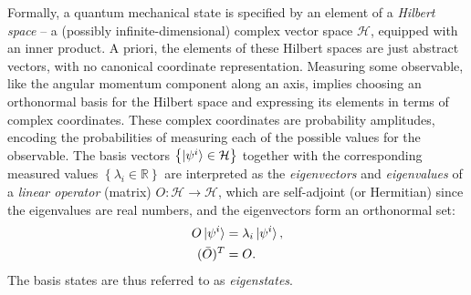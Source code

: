 \documentclass[12pt,final,3p]{elsarticle}
\begin{document}
Formally, a quantum mechanical state is specified by an element of a \emph{Hilbert space} -- a (possibly infinite-dimensional) complex vector space $\mathcal{H}$, equipped with an inner product. A priori, the elements of these Hilbert spaces are just abstract vectors, with no canonical coordinate representation. Measuring some observable, like the angular momentum component along an axis, implies choosing an orthonormal basis for the Hilbert space and expressing its elements in terms of complex coordinates. These complex coordinates are probability amplitudes, encoding the probabilities of measuring each of the possible values for the observable. The basis vectors $ \left\lbrace \ket{\psi^{i}} \in \mathcal{H}\right\rbrace  $ together with the corresponding measured values $ \left\lbrace \lambda_{i} \in \mathbb{R} \right\rbrace  $ are interpreted as the \emph{eigenvectors} and \emph{eigenvalues} of a \emph{linear operator} (matrix) $O: \mathcal{H} \rightarrow \mathcal{H}$, which are self-adjoint (or Hermitian) since the eigenvalues are real numbers, and the eigenvectors form an orthonormal set:
\begin{align}
O \ket{\psi^{i}} &= \lambda_{i}\ket{\psi^{i}}, \\
(\bar{O})^{T} &= O.
\end{align}
The basis states are thus referred to as \emph{eigenstates}. %
\end{document}
